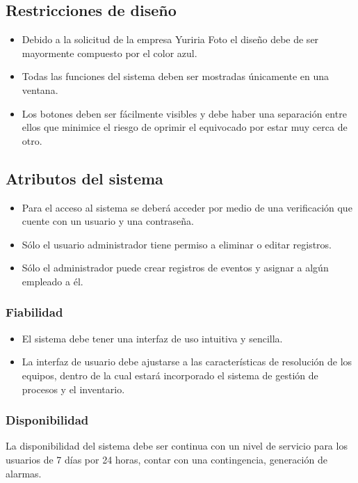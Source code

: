 \subsection{Restricciones de diseño}
\begin{itemize}
\item Debido a la solicitud de la empresa Yuriria Foto el diseño debe de ser mayormente compuesto por el color azul.
\item Todas las funciones del sistema deben ser mostradas únicamente en una ventana.
\item Los botones deben ser fácilmente visibles y debe haber una separación entre ellos que minimice el riesgo de oprimir el equivocado por estar muy cerca de otro.
\end{itemize}

\subsection{Atributos del sistema}
\begin{itemize}
\item Para el acceso al sistema se deberá acceder por medio de una verificación que cuente con un usuario y una contraseña.
\item Sólo el usuario administrador tiene permiso a eliminar o editar registros.
\item Sólo el administrador puede crear registros de eventos y asignar a algún empleado a él.
\end{itemize}

\subsubsection{Fiabilidad}
\begin{itemize}
\item El sistema debe tener una interfaz de uso intuitiva y sencilla.
\item La interfaz de usuario debe ajustarse a las características de resolución de los equipos, dentro de la cual estará incorporado el sistema de gestión de procesos y el inventario.
\end{itemize}

\subsubsection{Disponibilidad}

La disponibilidad del sistema debe ser continua con un nivel de servicio para los usuarios de 7 días por 24 horas, contar con una contingencia, generación de alarmas. 


